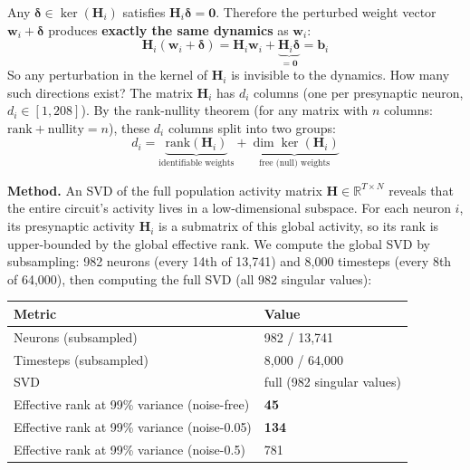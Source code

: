 \documentclass[11pt,a4paper]{article}
\begin{document}
Any $\boldsymbol{\delta} \in \ker(\mathbf{H}_i)$ satisfies $\mathbf{H}_i \boldsymbol{\delta} = \mathbf{0}$. Therefore the perturbed weight vector $\mathbf{w}_i + \boldsymbol{\delta}$ produces \textbf{exactly the same dynamics} as $\mathbf{w}_i$:
\begin{equation}
\mathbf{H}_i (\mathbf{w}_i + \boldsymbol{\delta}) = \mathbf{H}_i \mathbf{w}_i + \underbrace{\mathbf{H}_i \boldsymbol{\delta}}_{= \mathbf{0}} = \mathbf{b}_i
\end{equation}
So any perturbation in the kernel of $\mathbf{H}_i$ is invisible to the dynamics. How many such directions exist? The matrix $\mathbf{H}_i$ has $d_i$ columns (one per presynaptic neuron, $d_i \in [1, 208]$). By the rank-nullity theorem (for any matrix with $n$ columns: $\text{rank} + \text{nullity} = n$), these $d_i$ columns split into two groups:
\begin{equation}
d_i = \underbrace{\text{rank}(\mathbf{H}_i)}_{\text{identifiable weights}} + \underbrace{\dim\ker(\mathbf{H}_i)}_{\text{free (null) weights}}
\end{equation}

\noindent\textbf{Method.} An SVD of the full population activity matrix $\mathbf{H} \in \mathbb{R}^{T \times N}$ reveals that the entire circuit's activity lives in a low-dimensional subspace. For each neuron $i$, its presynaptic activity $\mathbf{H}_i$ is a submatrix of this global activity, so its rank is upper-bounded by the global effective rank. We compute the global SVD by subsampling: 982 neurons (every 14th of 13,741) and 8,000 timesteps (every 8th of 64,000), then computing the full SVD (all 982 singular values):

\begin{center}
\begin{tabular}{ll}
\toprule
Metric & Value \\
\midrule
Neurons (subsampled) & 982 / 13,741 \\
Timesteps (subsampled) & 8,000 / 64,000 \\
SVD & full (982 singular values) \\
Effective rank at 99\% variance (noise-free) & \textbf{45} \\
Effective rank at 99\% variance (noise-0.05) & \textbf{134} \\
Effective rank at 99\% variance (noise-0.5) & 781 \\
\bottomrule
\end{tabular}
\end{center}
\end{document}
